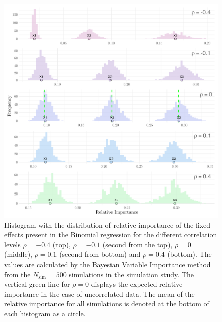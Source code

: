 \begin{figure}[H]
  \centering
  \includegraphics[width=1.1\linewidth]{Figures/Simulation study/Fixed_combined_logit.png}
  \caption[Relative importance of the fixed effects in Binomial GLMM]{Histogram with the distribution of relative importance of the fixed effects present in the Binomial regression for the different correlation levels $\rho=-0.4$ (top), $\rho=-0.1$ (second from the top), $\rho=0$ (middle), $\rho=0.1$ (second from bottom) and $\rho=0.4$ (bottom). The values are calculated by the Bayesian Variable Importance method from the $N_{\text{sim}}=500$ simulations in the simulation study. The vertical green line for $\rho=0$ displays the expected relative importance in the case of uncorrelated data. The mean of the relative importance for all simulations is denoted at the bottom of each histogram as a circle.}
  \label{fig:fixed_combined_logit}
\end{figure}
